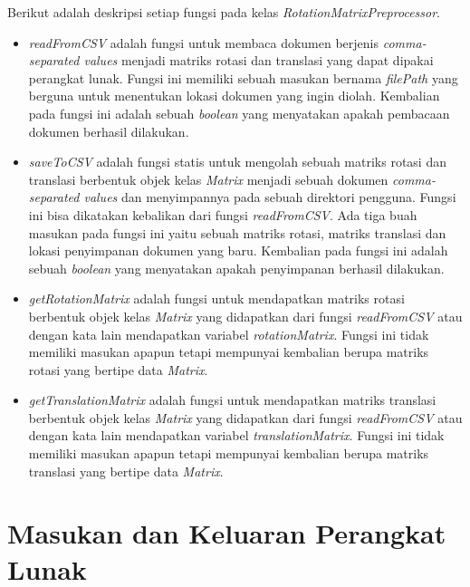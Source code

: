 Berikut adalah deskripsi setiap fungsi pada kelas \textit{RotationMatrixPreprocessor}.
\begin{itemize}
	\item \textit{readFromCSV} adalah fungsi untuk membaca dokumen berjenis \textit{comma-separated values} menjadi matriks rotasi dan translasi yang dapat dipakai perangkat lunak. Fungsi ini memiliki sebuah masukan bernama \textit{filePath} yang berguna untuk menentukan lokasi dokumen yang ingin diolah. Kembalian pada fungsi ini adalah sebuah \textit{boolean} yang menyatakan apakah pembacaan dokumen berhasil dilakukan.
	\item \textit{saveToCSV} adalah fungsi statis untuk mengolah sebuah matriks rotasi dan translasi berbentuk objek kelas \textit{Matrix} menjadi sebuah dokumen \textit{comma-separated values} dan menyimpannya pada sebuah direktori pengguna. Fungsi ini bisa dikatakan kebalikan dari fungsi \textit{readFromCSV}. Ada tiga buah masukan pada fungsi ini yaitu sebuah matriks rotasi, matriks translasi dan lokasi penyimpanan dokumen yang baru. Kembalian pada fungsi ini adalah sebuah \textit{boolean} yang menyatakan apakah penyimpanan berhasil dilakukan.
	\item \textit{getRotationMatrix} adalah fungsi untuk mendapatkan matriks rotasi berbentuk objek kelas \textit{Matrix} yang didapatkan dari fungsi \textit{readFromCSV} atau dengan kata lain mendapatkan variabel \textit{rotationMatrix}. Fungsi ini tidak memiliki masukan apapun tetapi mempunyai kembalian berupa matriks rotasi yang bertipe data \textit{Matrix}.
	\item \textit{getTranslationMatrix} adalah fungsi untuk mendapatkan matriks translasi berbentuk objek kelas \textit{Matrix} yang didapatkan dari fungsi \textit{readFromCSV} atau dengan kata lain mendapatkan variabel \textit{translationMatrix}. Fungsi ini tidak memiliki masukan apapun tetapi mempunyai kembalian berupa matriks translasi yang bertipe data \textit{Matrix}.
\end{itemize}

\section{Masukan dan Keluaran Perangkat Lunak}
\label{sec:masukan-pl}

